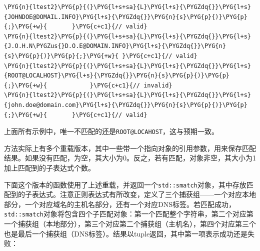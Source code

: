 \begin{codeblockbg}
\begin{Verbatim}[commandchars=\\\{\},breaklines=true,breakanywhere=true,fontsize=\codefont,xleftmargin=17bp]
\PYG{n}{ltest2}\PYG{p}{(}\PYG{l+s+sa}{L}\PYG{l+s}{\PYGZdq{}}\PYG{l+s}{JOHNDOE@DOMAIL.INFO}\PYG{l+s}{\PYGZdq{}}\PYG{n}{s}\PYG{p}{)}\PYG{p}{;}\PYG{+w}{       }\PYG{c+c1}{// valid}
\PYG{n}{ltest2}\PYG{p}{(}\PYG{l+s+sa}{L}\PYG{l+s}{\PYGZdq{}}\PYG{l+s}{J.O.H.N\PYGZus{}D.O.E@DOMAIN.INFO}\PYG{l+s}{\PYGZdq{}}\PYG{n}{s}\PYG{p}{)}\PYG{p}{;}\PYG{+w}{ }\PYG{c+c1}{// valid}
\PYG{n}{ltest2}\PYG{p}{(}\PYG{l+s+sa}{L}\PYG{l+s}{\PYGZdq{}}\PYG{l+s}{ROOT@LOCALHOST}\PYG{l+s}{\PYGZdq{}}\PYG{n}{s}\PYG{p}{)}\PYG{p}{;}\PYG{+w}{            }\PYG{c+c1}{// invalid}
\PYG{n}{ltest2}\PYG{p}{(}\PYG{l+s+sa}{L}\PYG{l+s}{\PYGZdq{}}\PYG{l+s}{john.doe@domain.com}\PYG{l+s}{\PYGZdq{}}\PYG{n}{s}\PYG{p}{)}\PYG{p}{;}\PYG{+w}{       }\PYG{c+c1}{// valid}
\end{Verbatim}
\end{codeblockbg}



上面所有示例中，唯一不匹配的还是\texttt{ROOT@LOCAHOST}，这与预期一致。



方法实际上有多个重载版本，其中一些带一个指向对象的引用参数，用来保存匹配结果。如果没有匹配，为空，其大小为0。反之，若有匹配，对象非空，其大小为1加上匹配到的子表达式个数。



下面这个版本的函数使用了上述重载，并返回一个\texttt{std::\allowbreak{}smatch}对象，其中存放匹配到的子表达式。注意正则表达式有所改变，定义了三个捕获组——一个对应本地部分，一个对应域名的主机名部分，还有一个对应DNS标签。若匹配成功，\texttt{std::\allowbreak{}smatch}对象将包含四个子匹配对象：第一个匹配整个字符串，第二个对应第一个捕获组（本地部分），第三个对应第二个捕获组（主机名），第四个对应第三个也是最后一个捕获组（DNS标签）。结果以tuple返回，其中第一项表示成功还是失败：



